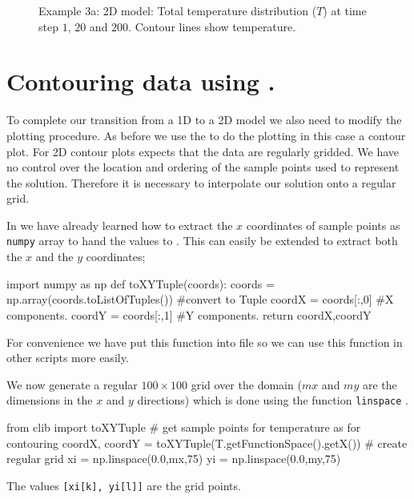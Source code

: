 \begin{figure}[ht]
\caption{Example 3a: 2D model: Total temperature distribution ($T$) at time step
$1$, $20$ and $200$. Contour lines show temperature.}
\label{fig:twodhdans}
\end{figure}

\section{Contouring \esc data using \modmpl.}
\label{Sec:2DHD plot}
To complete our transition from a 1D to a 2D model we also need to modify the 
plotting procedure. As before we use the  \modmpl to do the plotting 
in this case a contour plot. For 2D contour plots \modmpl expects that the
data are regularly gridded. We have no control over the location and ordering of
the sample points
used to represent the solution. Therefore it is necessary to interpolate our
solution onto a regular grid.

In  we have already learned how to extract the $x$
coordinates of sample points as 
\verb|numpy| array to hand the values to \modmpl. This can easily be extended to
extract both the
$x$ and the $y$ coordinates;
\begin{python}
import numpy as np
def toXYTuple(coords):
    coords = np.array(coords.toListOfTuples()) #convert to Tuple
    coordX = coords[:,0] #X components.
    coordY = coords[:,1] #Y components.
    return coordX,coordY
\end{python}
For convenience we have put this function into  file so we can use
this
function in other scripts more easily. 


We now generate a regular $100 \times 100$ grid over the domain ($mx$ and $my$ 
are the dimensions in the $x$ and $y$ directions) which is done using the
\modnumpy function \verb|linspace|  . 
\begin{python}
from clib import toXYTuple
# get sample points for temperature as  for contouring      
coordX, coordY = toXYTuple(T.getFunctionSpace().getX())
# create regular grid
xi = np.linspace(0.0,mx,75)
yi = np.linspace(0.0,my,75)
\end{python}
The values \verb|[xi[k], yi[l]]| are the grid points.

